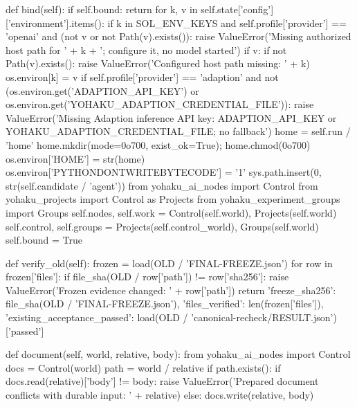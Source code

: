     def bind(self):
        if self.bound:
            return
        for k, v in self.state['config']['environment'].items():
            if k in SOL_ENV_KEYS and self.profile['provider'] == 'openai' and (not v or not Path(v).exists()):
                raise ValueError('Missing authorized host path for ' + k + '; configure it, no model started')
            if v:
                if not Path(v).exists():
                    raise ValueError('Configured host path missing: ' + k)
                os.environ[k] = v
        if self.profile['provider'] == 'adaption' and not (os.environ.get('ADAPTION_API_KEY') or os.environ.get('YOHAKU_ADAPTION_CREDENTIAL_FILE')):
            raise ValueError('Missing Adaption inference API key: ADAPTION_API_KEY or YOHAKU_ADAPTION_CREDENTIAL_FILE; no fallback')
        home = self.run / 'home'
        home.mkdir(mode=0o700, exist_ok=True); home.chmod(0o700)
        os.environ['HOME'] = str(home)
        os.environ['PYTHONDONTWRITEBYTECODE'] = '1'
        sys.path.insert(0, str(self.candidate / 'agent'))
        from yohaku_ai_nodes import Control
        from yohaku_projects import Control as Projects
        from yohaku_experiment_groups import Groups
        self.nodes, self.work = Control(self.world), Projects(self.world)
        self.control, self.groups = Projects(self.control_world), Groups(self.world)
        self.bound = True

    def verify_old(self):
        frozen = load(OLD / 'FINAL-FREEZE.json')
        for row in frozen['files']:
            if file_sha(OLD / row['path']) != row['sha256']:
                raise ValueError('Frozen evidence changed: ' + row['path'])
        return {'freeze_sha256': file_sha(OLD / 'FINAL-FREEZE.json'),
                'files_verified': len(frozen['files']), 'existing_acceptance_passed': load(OLD / 'canonical-recheck/RESULT.json')['passed']}

    def document(self, world, relative, body):
        from yohaku_ai_nodes import Control
        docs = Control(world)
        path = world / relative
        if path.exists():
            if docs.read(relative)['body'] != body:
                raise ValueError('Prepared document conflicts with durable input: ' + relative)
        else:
            docs.write(relative, body)

